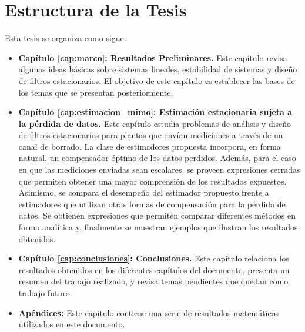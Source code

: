 \section{Estructura de la Tesis}
Esta tesis se organiza como sigue:
\begin{itemize}
\item{\bf Cap\'itulo \ref{cap:marco}: Resultados Preliminares.} Este cap\'itulo revisa algunas ideas b\'asicas sobre sistemas lineales, estabilidad de sistemas y dise\~no de filtros estacionarios. El objetivo de este cap\'itulo es establecer las bases de los temas que se presentan posteriormente.

\item{\bf Cap\'itulo \ref{cap:estimacion_mimo}: Estimaci\'on estacionaria sujeta a la p\'erdida de datos.} Este cap\'itulo estudia problemas de an\'alisis y dise\~no de filtros estacionarios para plantas que env\'ian mediciones a trav\'es de un canal de borrado. La clase de estimadores propuesta incorpora, en forma natural, un compensador \'optimo de los datos perdidos. Adem\'as, para el caso en que las mediciones enviadas sean escalares, se proveen expresiones cerradas que permiten obtener una mayor comprensi\'on de los resultados expuestos. Asimismo, se compara el desempe\~no del estimador propuesto frente a estimadores que utilizan otras formas de compensaci\'on para la p\'erdida de datos. Se obtienen expresiones que permiten comparar diferentes m\'etodos en forma anal\'itica y, finalmente se muestran ejemplos que ilustran los resultados obtenidos.


\item{\bf Cap\'itulo \ref{cap:conclusiones}: Conclusiones.} Este cap\'itulo relaciona los resultados obtenidos en los diferentes cap\'itulos del documento, presenta un resumen del trabajo realizado, y revisa temas pendientes que quedan como trabajo futuro.

\item {\bf Ap\'endices:} Este cap\'itulo contiene una serie de resultados matem\'aticos utilizados en este documento.
\end{itemize}

